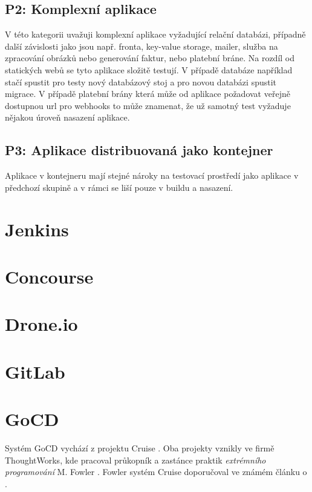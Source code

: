         \subsection{P2: Komplexní aplikace}
            V této kategorii uvažuji komplexní aplikace vyžadující relační databázi, případně další závislosti jako jsou např. fronta, key-value storage, mailer, služba na zpracování obrázků nebo generování faktur, nebo platební bráne. Na rozdíl od statických webů se tyto aplikace složitě testují. V případě databáze například stačí spustit pro testy nový databázový stoj a pro novou databázi spustit migrace. V případě platební brány která může od aplikace požadovat veřejně dostupnou url pro webhooks to může znamenat, že už samotný test vyžaduje nějakou úroveň nasazení aplikace. 

            \blind[1]


        \subsection{P3: Aplikace distribuovaná jako kontejner}
            Aplikace v kontejneru mají stejné nároky na testovací prostředí jako aplikace v předchozí skupině a v rámci \CICD se liší pouze v buildu a nasazení.

            \blind[1]

    \section{Jenkins}
    \section{Concourse}
    \section{Drone.io}
    \section{GitLab}

    \section{GoCD}
        Systém GoCD vychází z projektu Cruise \cite{thoughtworks-gocd}. Oba projekty vznikly ve firmě ThoughtWorks, kde pracoval průkopník a zastánce praktik \textit{extrémního programování} M. Fowler \cite{fowler-go}. Fowler systém Cruise doporučoval ve známém článku o \CI \cite{fowler-ci}.

